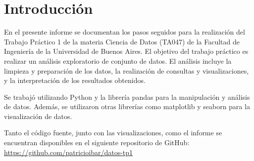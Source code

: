 \section{Introducción}
En el presente informe se documentan los pasos seguidos para la realización del Trabajo Práctico 1 de la materia Ciencia de Datos (TA047) de la Facultad de Ingeniería de la Universidad de Buenos Aires. El objetivo del trabajo práctico es realizar un análisis exploratorio de conjunto de datos. El análisis incluye la limpieza y preparación de los datos, la realización de consultas y visualizaciones, y la interpretación de los resultados obtenidos.

Se trabajó utilizando Python y la librería pandas para la manipulación y análisis de datos. Además, se utilizaron otras librerías como matplotlib y seaborn para la visualización de datos.

Tanto el código fuente, junto con las visualizaciones, como el informe se encuentran disponibles en el siguiente repositorio de GitHub: \url{https://github.com/patricioibar/datos-tp1}